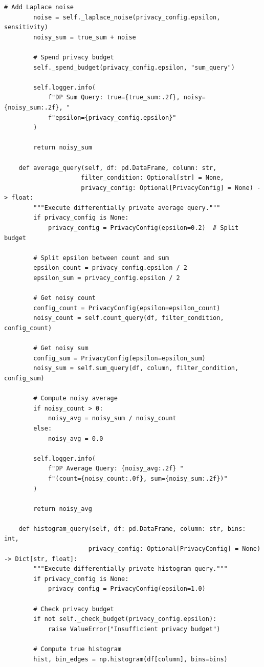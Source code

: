\begin{lstlisting}[style=python, caption=PrivacyPreservingPipeline with Differential Privacy]
        # Add Laplace noise
        noise = self._laplace_noise(privacy_config.epsilon, sensitivity)
        noisy_sum = true_sum + noise

        # Spend privacy budget
        self._spend_budget(privacy_config.epsilon, "sum_query")

        self.logger.info(
            f"DP Sum Query: true={true_sum:.2f}, noisy={noisy_sum:.2f}, "
            f"epsilon={privacy_config.epsilon}"
        )

        return noisy_sum

    def average_query(self, df: pd.DataFrame, column: str,
                     filter_condition: Optional[str] = None,
                     privacy_config: Optional[PrivacyConfig] = None) -> float:
        """Execute differentially private average query."""
        if privacy_config is None:
            privacy_config = PrivacyConfig(epsilon=0.2)  # Split budget

        # Split epsilon between count and sum
        epsilon_count = privacy_config.epsilon / 2
        epsilon_sum = privacy_config.epsilon / 2

        # Get noisy count
        config_count = PrivacyConfig(epsilon=epsilon_count)
        noisy_count = self.count_query(df, filter_condition, config_count)

        # Get noisy sum
        config_sum = PrivacyConfig(epsilon=epsilon_sum)
        noisy_sum = self.sum_query(df, column, filter_condition, config_sum)

        # Compute noisy average
        if noisy_count > 0:
            noisy_avg = noisy_sum / noisy_count
        else:
            noisy_avg = 0.0

        self.logger.info(
            f"DP Average Query: {noisy_avg:.2f} "
            f"(count={noisy_count:.0f}, sum={noisy_sum:.2f})"
        )

        return noisy_avg

    def histogram_query(self, df: pd.DataFrame, column: str, bins: int,
                       privacy_config: Optional[PrivacyConfig] = None) -> Dict[str, float]:
        """Execute differentially private histogram query."""
        if privacy_config is None:
            privacy_config = PrivacyConfig(epsilon=1.0)

        # Check privacy budget
        if not self._check_budget(privacy_config.epsilon):
            raise ValueError("Insufficient privacy budget")

        # Compute true histogram
        hist, bin_edges = np.histogram(df[column], bins=bins)


\end{lstlisting}
